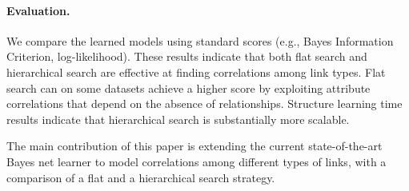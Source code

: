 \documentclass{article}
\begin{document}

\paragraph{Evaluation.} We compare the learned models using standard scores (e.g., Bayes Information Criterion, log-likelihood). 
These results indicate that both flat search and hierarchical search are effective at finding correlations among link types. 
Flat search can on some datasets achieve a higher score by exploiting attribute correlations that depend on the absence of relationships. 
Structure learning time results indicate that hierarchical search is substantially more scalable.

The main contribution of this paper is extending the current state-of-the-art  
Bayes net learner to model correlations among different types of links, with a comparison of a flat 
and a hierarchical search strategy.

% 
\end{document}
